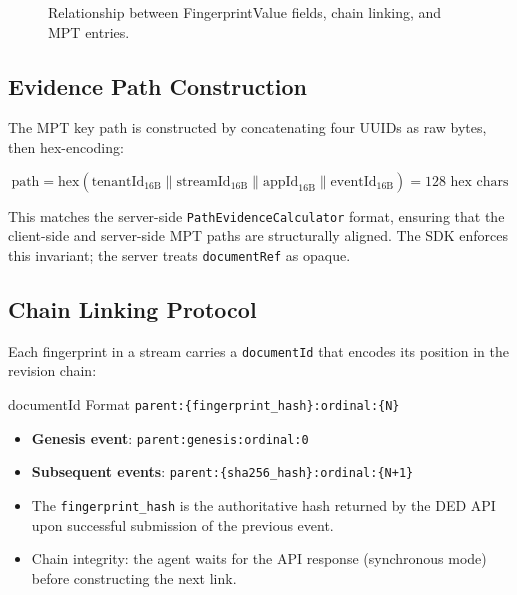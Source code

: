 \documentclass[11pt,a4paper]{article}
\begin{document}
\begin{figure}[H]
\caption{Relationship between FingerprintValue fields, chain linking, and MPT entries.}
\label{fig:datamodel}
\end{figure}

\subsection{Evidence Path Construction}

The MPT key path is constructed by concatenating four UUIDs as raw bytes, then
hex-encoding:

\[
  \text{path} = \text{hex}(\text{tenantId}_{16\text{B}} \| \text{streamId}_{16\text{B}}
  \| \text{appId}_{16\text{B}} \| \text{eventId}_{16\text{B}}) = 128 \text{ hex chars}
\]

This matches the server-side \texttt{PathEvidenceCalculator} format, ensuring that the
client-side and server-side MPT paths are structurally aligned. The SDK enforces this
invariant; the server treats \texttt{documentRef} as opaque.

\subsection{Chain Linking Protocol}

Each fingerprint in a stream carries a \texttt{documentId} that encodes its position in
the revision chain:

\begin{defbox}{documentId Format}
\texttt{parent:\{fingerprint\_hash\}:ordinal:\{N\}}
\end{defbox}

\begin{itemize}
  \item \textbf{Genesis event}: \texttt{parent:genesis:ordinal:0}
  \item \textbf{Subsequent events}: \texttt{parent:\{sha256\_hash\}:ordinal:\{N+1\}}
  \item The \texttt{fingerprint\_hash} is the authoritative hash returned by the DED API
    upon successful submission of the previous event.
  \item Chain integrity: the agent waits for the API response (synchronous mode) before
    constructing the next link.
\end{itemize}
\end{document}
